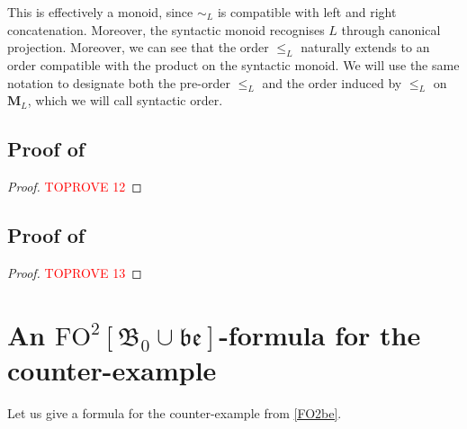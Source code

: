 \documentclass[a4paper,UKenglish,cleveref, autoref, thm-restate]{lipics-v2021}
\newcommand{\FO}{\mathrm{FO}}
\newcommand{\FOtw}{\FO^2}
\newcommand{\be}{\mathfrak{be}}
\newcommand{\bin}{\mathfrak{B}}
\newcommand{\M}{\mathbf{M}}
\begin{document}
\begin{remark}
    This is effectively a monoid, since $\sim_L$ is compatible with left and right concatenation. Moreover, the syntactic monoid recognises $L$ through canonical projection. Moreover, we can see that the order $\leq_L$ naturally extends to an order compatible with the product on the syntactic monoid. We will use the same notation to designate both the pre-order $\leq_L$ and the order induced by $\leq_L$ on $\M_L$, which we will call syntactic order.
\end{remark}







\subsection{\texorpdfstring{Proof of }{Proof of Lemma 29}} \label{ap:proofordrmono}


\begin{proof}\textcolor{red}{TOPROVE 12}\end{proof}








\subsection{\texorpdfstring{Proof of }{Proof of Proposition 32}} \label{ap:proofmon}


\begin{proof}\textcolor{red}{TOPROVE 13}\end{proof}


















\section{\texorpdfstring{An $\FOtw[\bin_0 \cup \be]$-formula for the counter-example}{An FO2[<,S,,be]-formula for the counter-example}} \label{ap:formula}



Let us give a formula for the counter-example from \cref{FO2be}.
\end{document}
